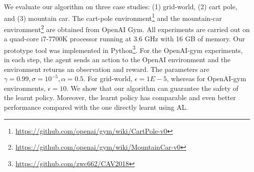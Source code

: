 We evaluate our algorithm on three case studies: (1) grid-world, (2) cart pole, and (3) mountain car. The cart-pole environment\footnote{\url{https://github.com/openai/gym/wiki/CartPole-v0}} and the mountain-car environment\footnote{\url{https://github.com/openai/gym/wiki/MountainCar-v0}} are obtained from OpenAI Gym. All experiments are carried out on a quad-core i7-7700K processor running at 3.6 GHz with 16 GB of memory. 
Our prototype tool was implemented in Python\footnote{\url{https://github.com/zwc662/CAV2018}}.
For the OpenAI-gym experiments, in each step, the agent sends an action to the OpenAI environment and the environment returns an observation and reward. 
The parameters are $\gamma=0.99, \sigma=10^{-5}, \alpha=0.5$. For grid-world, $\epsilon=1E-5$, whereas for OpenAI-gym environments, $\epsilon=10$.
We show that our algorithm can guarantee the safety of the learnt policy. Moreover, the learnt policy has comparable and even better performance compared with the one directly learnt using AL. 
